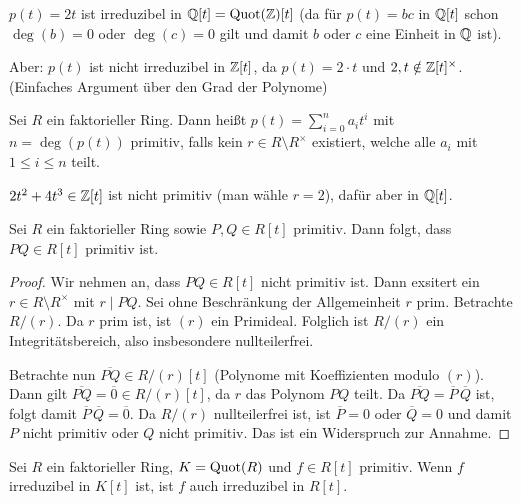 \documentclass[12pt,a4paper]{scrartcl}
\begin{document}
\begin{bsp}
	$p(t) = 2t$ ist irreduzibel in $\mathbb Q[t] = \operatorname{Quot}(\mathbb Z)[t]$ (da für $p(t) = bc$ in $\mathbb Q[t]$ schon $\deg(b) = 0$ oder $\deg(c) = 0$ gilt und damit $b$ oder $c$ eine Einheit in $\mathbb Q$ ist).
	
	Aber: $p(t)$ ist nicht irreduzibel in $\mathbb Z[t]$, da $p(t) = 2\cdot t$ und $2, t\notin \mathbb Z[t]^{\times}$. (Einfaches Argument über den Grad der Polynome)
\end{bsp}

\begin{defi}\label{def:primitiv}
	Sei $R$ ein faktorieller Ring. Dann heißt $p(t) = \sum_{i = 0}^na_it^i$ mit $n = \deg (p(t))$ primitiv, falls kein $r\in R\setminus R^{\times}$ existiert, welche alle $a_i$ mit $1\leq i\leq n$ teilt.
\end{defi}

\begin{bsp}
	$2t^2+4t^3\in\mathbb Z[t]$ ist nicht primitiv (man wähle $r = 2$), dafür aber in $\mathbb Q[t]$.
\end{bsp}

\begin{lem}\label{lem:gauss}
	Sei $R$ ein faktorieller Ring sowie $P,Q\in R[t]$ primitiv. Dann folgt, dass $PQ\in R[t]$ primitiv ist.	
\end{lem}

\begin{proof}
	Wir nehmen an, dass $PQ\in R[t]$ nicht primitiv ist. Dann exsitert ein $r\in R\setminus R^{\times}$ mit $r\mid PQ$. Sei ohne Beschränkung der Allgemeinheit $r$ prim. Betrachte $R/(r)$. Da $r$ prim ist, ist $(r)$ ein Primideal. Folglich ist $R/(r)$ ein Integritätsbereich, also insbesondere nullteilerfrei.
	
	Betrachte nun $\overline{PQ} \in R/(r)[t]$ (Polynome mit Koeffizienten modulo $(r)$). Dann gilt $\overline{PQ} = \overline{0}\in R/(r)[t]$, da $r$ das Polynom $PQ$ teilt. Da $\overline{PQ} = \overline{P}\,\overline{Q}$ ist, folgt damit $\overline{P}\,\overline{Q} = \overline{0}$. Da $R/(r)$ nullteilerfrei ist, ist $\overline{P} = 0$ oder $\overline{Q} = 0$ und damit $P$ nicht primitiv oder $Q$ nicht primitiv. Das ist ein Widerspruch zur Annahme.
\end{proof}

\begin{lem}\label{lem:faktquotirred}
	Sei $R$ ein faktorieller Ring, $K = \operatorname{Quot} (R)$ und $f\in R[t]$ primitiv. Wenn $f$ irreduzibel in $K[t]$ ist, ist $f$ auch irreduzibel in $R[t]$. 
\end{lem}
\end{document}
